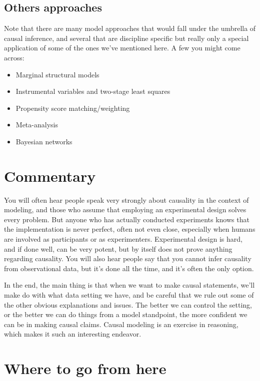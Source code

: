 \documentclass[
  letterpaper,
]{krantz}
\providecommand{\tightlist}{%
  \setlength{\itemsep}{0pt}\setlength{\parskip}{0pt}}\usepackage{longtable,booktabs,array}
\begin{document}
\subsection{Others approaches}\label{others-approaches}

Note that there are many model approaches that would fall under the
umbrella of causal inference, and several that are discipline specific
but really only a special application of some of the ones we've
mentioned here. A few you might come across:

\begin{itemize}
\tightlist
\item
  Marginal structural models
\item
  Instrumental variables and two-stage least squares
\item
  Propensity score matching/weighting
\item
  Meta-analysis
\item
  Bayesian networks
\end{itemize}

\section{Commentary}\label{commentary-6}

You will often hear people speak very strongly about causality in the
context of modeling, and those who assume that employing an experimental
design solves every problem. But anyone who has actually conducted
experiments knows that the implementation is never perfect, often not
even close, especially when humans are involved as participants or as
experimenters. Experimental design is hard, and if done well, can be
very potent, but by itself does not prove anything regarding causality.
You will also hear people say that you cannot infer causality from
observational data, but it's done all the time, and it's often the only
option.

In the end, the main thing is that when we want to make causal
statements, we'll make do with what data setting we have, and be careful
that we rule out some of the other obvious explanations and issues. The
better we can control the setting, or the better we can do things from a
model standpoint, the more confident we can be in making causal claims.
Causal modeling is an exercise in reasoning, which makes it such an
interesting endeavor.

\section{Where to go from here}\label{where-to-go-from-here-3}
\end{document}
